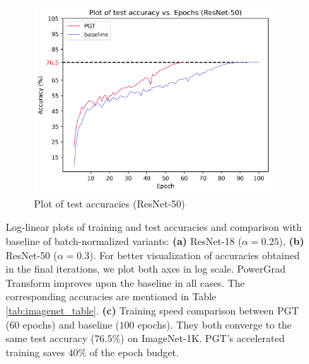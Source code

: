 \documentclass[times,sort&compress]{elsarticle}
\begin{document}
\begin{figure}[!t]
\begin{subfigure}{.33\textwidth}
\centering
\includegraphics[width=0.98\textwidth]{acc_vs_epoch_r50_60epochs}
\caption{Plot of test accuracies (ResNet-50)}
\end{subfigure}
\caption{ Log-linear plots of training and test accuracies and comparison with baseline
of batch-normalized variants: \textbf{(a)} ResNet-18 ($\alpha=0.25$), \textbf{(b)}
ResNet-50 ($\alpha=0.3$). For better visualization of accuracies obtained in the final
iterations, we plot both axes in log scale. PowerGrad Transform improves upon the
baseline in all cases. The corresponding accuracies are mentioned in Table
\ref{tab:imagenet_table}. \textbf{(c)} Training speed comparison between PGT ($60$
epochs) and baseline ($100$ epochs). They both converge to the same test accuracy
($76.5\%$) on ImageNet-1K. PGT's accelerated training saves $40\%$ of the epoch budget.
}
\label{fig:metrics}
\end{figure}
\end{document}
